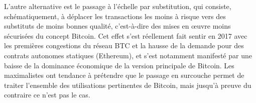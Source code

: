 L'autre alternative est le passage à l'échelle par substitution, qui consiste, schématiquement, à déplacer les transactions les moins à risque vers des substituts de moins bonnes qualité, c'est-à-dire des mises en œuvre moins sécurisées du concept Bitcoin. Cet effet s'est réellement fait sentir en 2017 avec les premières congestions du réseau BTC et la hausse de la demande pour des contrats autonomes statiques (Ethereum), et s'est notamment manifesté par une baisse de la dominance économique de la version principale de Bitcoin. Les maximalistes ont tendance à prétendre que le passage en surcouche permet de traiter l'ensemble des utilisations pertinentes de Bitcoin, mais jusqu'à preuve du contraire ce n'est pas le cas.